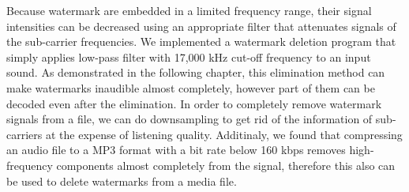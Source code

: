 Because watermark are embedded in a limited frequency range, their signal intensities can be decreased using an appropriate filter that attenuates signals of the sub-carrier frequencies.
We implemented a watermark deletion program that simply applies low-pass filter with 17,000 kHz cut-off frequency to an input sound.
As demonstrated in the following chapter, this elimination method can make watermarks inaudible almost completely, however part of them can be decoded even after the elimination.
In order to completely remove watermark signals from a file, we can do downsampling to get rid of the information of sub-carriers at the expense of listening quality.
Additinaly, we found that compressing an audio file to a MP3 format with a bit rate below 160 kbps removes high-frequency components almost completely from the signal, therefore this also can be used to delete watermarks from a media file.

